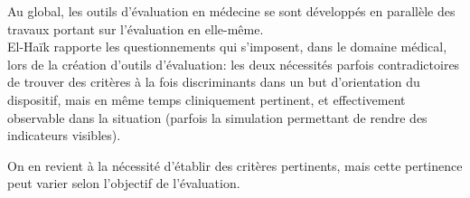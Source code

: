 \documentclass{article}
\begin{document}
Au global, les outils d'évaluation en médecine se sont développés en 
parallèle des travaux portant sur l'évaluation en elle-même. 
\\

El-Haïk \cite{elhaik-wagner_scorer_2024} rapporte les questionnements qui
s'imposent, dans le domaine médical, lors de la création d'outils 
d'évaluation: les deux nécessités parfois contradictoires de trouver
des critères à la fois discriminants dans un but d'orientation du
dispositif, mais en même temps cliniquement pertinent, et effectivement
observable dans la situation (parfois la simulation permettant de rendre
des indicateurs visibles).

On en revient à la nécessité d'établir des critères pertinents, mais cette
pertinence peut varier selon l'objectif de l'évaluation.

\printbibliography
\end{document}
